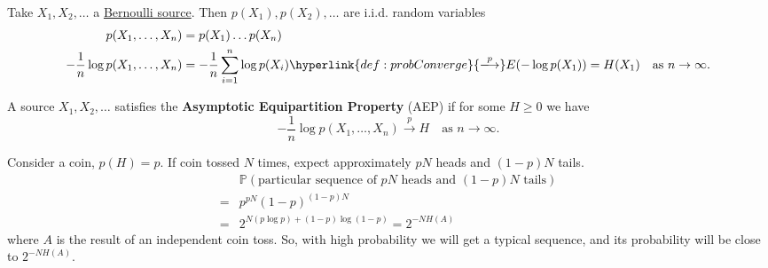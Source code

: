 \documentclass{article}
\newcommand{\probConv}{\hyperlink{def:probConverge}{\xlongrightarrow{p}}}
\newcommand{\Prob}{\mathbb{P}}
\newcommand{\1}[1]{\mathbbm{1}_{#1}}
\begin{document}
\begin{eg}[Application]
    Take $X_1, X_2, \dotsc$ a \hyperlink{def:memoryless}{Bernoulli source}. Then $p(X_1), p(X_2), \dotsc$ are i.i.d. random variables
    \begin{align*}
        p(X_1, \dotsc, X_n) &= p(X_1) \dotsc p(X_n) \\
        -\frac{1}{n} \log p(X_1, \dotsc, X_n) &= -\frac{1}{n} \sum_{i=1}^n \log p(X_i) \probConv E(-\log p(X_1)) = H(X_1) \quad \text{as } n \to \infty.
    \end{align*}
\end{eg}
\begin{defi}
    \leavevmode

    A source $X_1, X_2, \dotsc$ satisfies the \hypertarget{def:aep}{\textbf{Asymptotic Equipartition Property}} (AEP) if for some $H\geq 0$ we have
    \begin{equation*}
        -\frac{1}{n} \log p(X_1, \dotsc, X_n) \xrightarrow{p} H \quad \text{as } n \to \infty.
    \end{equation*}
\end{defi}
\begin{eg}
    Consider a coin, $p(H) = p$. If coin tossed $N$ times, expect approximately $pN$ heads and $(1-p)N$ tails.
    \begin{align*}
        &\Prob(\text{particular sequence of $pN$ heads and $(1-p)N$ tails}) \\
        =&p^{pN} (1-p)^{(1-p)N}\\
        =&2^{N(p \log p) + (1-p) \log (1-p)} = 2^{-N H(A)}
    \end{align*}
    where $A$ is the result of an independent coin toss.
    So, with high probability we will get a typical sequence, and its probability will be close to $2^{-NH(A)}$.
\end{eg}
\end{document}
